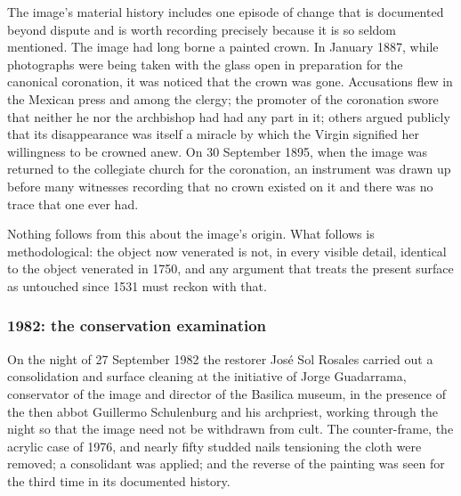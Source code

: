 The image's material history includes one episode of change that is
documented beyond dispute and is worth recording precisely because it
is so seldom mentioned. The image had long borne a painted crown. In
January 1887, while photographs were being taken with the glass open
in preparation for the canonical coronation, it was noticed that the
crown was gone. Accusations flew in the Mexican press and among the
clergy; the promoter of the coronation swore that neither he nor the
archbishop had had any part in it; others argued publicly that its
disappearance was itself a miracle by which the Virgin signified her
willingness to be crowned anew. On 30 September 1895, when the image
was returned to the collegiate church for the coronation, an
instrument was drawn up before many witnesses recording that no crown
existed on it and there was no trace that one ever had.

Nothing follows from this about the image's origin. What follows is
methodological: the object now venerated is not, in every visible
detail, identical to the object venerated in 1750, and any argument
that treats the present surface as untouched since 1531 must reckon
with that.

\subsubsection*{1982: the conservation examination}

On the night of 27 September 1982 the restorer Jos\'e Sol Rosales
carried out a consolidation and surface cleaning at the initiative of
Jorge Guadarrama, conservator of the image and director of the
Basilica museum, in the presence of the then abbot Guillermo
Schulenburg and his archpriest, working through the night so that the
image need not be withdrawn from cult. The counter-frame, the acrylic
case of 1976, and nearly fifty studded nails tensioning the cloth
were removed; a consolidant was applied; and the reverse of the
painting was seen for the third time in its documented history.

